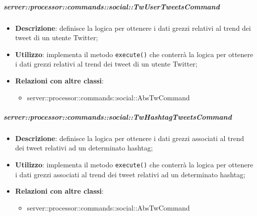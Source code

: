         \subparagraph{server::processor::commands::social::TwUserTweetsCommand} %
        \label{subp:bdsm_app_server_processor_commands_social_twcommand}
        \begin{itemize}
          \item \textbf{Descrizione}: definisce la logica per ottenere i dati grezzi relativi al trend dei tweet di un utente Twitter;
          \item \textbf{Utilizzo}: implementa il metodo \texttt{execute()} che conterrà la logica per ottenere i dati grezzi relativi al trend dei tweet di un utente Twitter;
          \item \textbf{Relazioni con altre classi}:
            \begin{itemize}
              \item server::processor::commands::social::AbsTwCommand
            \end{itemize}
        \end{itemize}

        \subparagraph{server::processor::commands::social::TwHashtagTweetsCommand} %
        \label{subp:bdsm_app_server_processor_commands_social_twhashtagtweetscommand}
        \begin{itemize}
          \item \textbf{Descrizione}: definisce la logica per ottenere i dati grezzi associati al trend dei tweet relativi ad un determinato hashtag;
          \item \textbf{Utilizzo}: implementa il metodo \texttt{execute()} che conterrà la logica per ottenere i dati grezzi associati al trend dei tweet relativi ad un determinato hashtag;
          \item \textbf{Relazioni con altre classi}:
            \begin{itemize}
              \item server::processor::commands::social::AbsTwCommand
            \end{itemize}
        \end{itemize}


